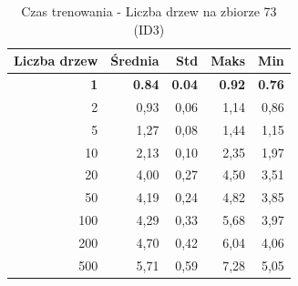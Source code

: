 \begin{table}[htbp]
\centering
\small
\setlength{\tabcolsep}{6pt}
\renewcommand{\arraystretch}{1.2}
\caption{Czas trenowania - Liczba drzew na zbiorze 73 (ID3)}
\label{tab:ID3_tree_count_73_time}
\begin{tabular}{r|r|r|r|r}
\toprule
Liczba drzew & Średnia & Std & Maks & Min \\
\hline
\textbf{1} & \textbf{0.84} & \textbf{0.04} & \textbf{0.92} & \textbf{0.76} \\
2 & 0,93 & 0,06 & 1,14 & 0,86 \\
5 & 1,27 & 0,08 & 1,44 & 1,15 \\
10 & 2,13 & 0,10 & 2,35 & 1,97 \\
20 & 4,00 & 0,27 & 4,50 & 3,51 \\
50 & 4,19 & 0,24 & 4,82 & 3,85 \\
100 & 4,29 & 0,33 & 5,68 & 3,97 \\
200 & 4,70 & 0,42 & 6,04 & 4,06 \\
500 & 5,71 & 0,59 & 7,28 & 5,05 \\
\bottomrule
\end{tabular}
\end{table}